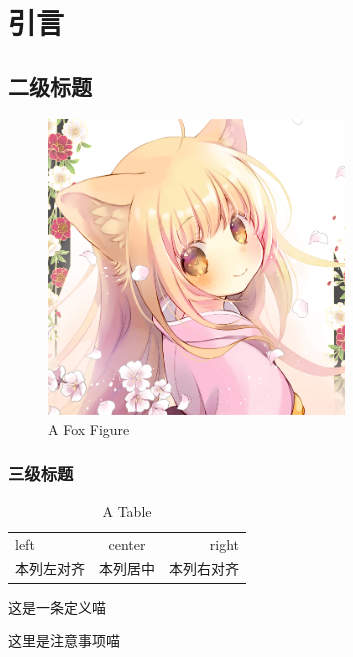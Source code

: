 \chapter{引言}

\section{二级标题}

\zhlipsum

\begin{figure}[H]
\centering
\includegraphics[width=0.7\textwidth]{figs/yurzi-avatar.png}
\caption{A Fox Figure}
\label{fig.1}
\end{figure}

\subsection{三级标题}

\begin{table}
\caption{A Table}
\begin{tabular}{lcr}
left&center&right\\  
本列左对齐&本列居中&本列右对齐\\
\end{tabular}
\end{table}

\begin{definition}
这是一条定义喵
\end{definition}

\begin{notice*}
这里是注意事项喵
\end{notice*}

\zhlipsum

